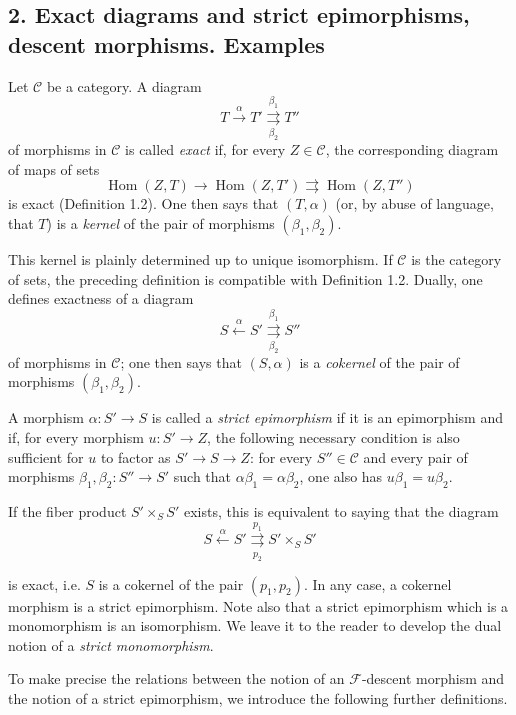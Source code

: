 \subsection*{2. Exact diagrams and strict epimorphisms, descent morphisms.
Examples}

 Let $\mathcal C$ be a category. A diagram
\[
  T\xrightarrow{\alpha}T'
  \overset{\beta_1}{\underset{\beta_2}{\rightrightarrows}}T''
\]
of morphisms in $\mathcal C$ is called \emph{exact} if, for every
$Z\in\mathcal C$, the corresponding diagram of maps of sets
\[
  \operatorname{Hom}(Z,T)\longrightarrow
  \operatorname{Hom}(Z,T')
  \rightrightarrows\operatorname{Hom}(Z,T'')
\]
is exact (Definition 1.2). One then says that $(T,\alpha)$ (or, by abuse of
language, that $T$) is a \emph{kernel} of the pair of morphisms
$(\beta_1,\beta_2)$.

This kernel is plainly determined up to unique isomorphism. If $\mathcal C$ is
the category of sets, the preceding definition is compatible with Definition
1.2. Dually, one defines exactness of a diagram
\[
  S\xleftarrow{\alpha}S'
  \overset{\beta_1}{\underset{\beta_2}{\rightrightarrows}}S''
\]
of morphisms in $\mathcal C$; one then says that $(S,\alpha)$ is a
\emph{cokernel} of the pair of morphisms $(\beta_1,\beta_2)$.

 A morphism $\alpha:S'\longrightarrow S$ is called a
\emph{strict epimorphism} if it is an epimorphism and if, for every morphism
$u:S'\longrightarrow Z$, the following necessary condition is also sufficient
for $u$ to factor as $S'\longrightarrow S\longrightarrow Z$: for every
$S''\in\mathcal C$ and every pair of morphisms
$\beta_1,\beta_2:S''\longrightarrow S'$ such that
$\alpha\beta_1=\alpha\beta_2$, one also has $u\beta_1=u\beta_2$.

If the fiber product $S'\times_S S'$ exists, this is equivalent to saying that
the diagram
\[
  S\xleftarrow{\alpha}S'
  \overset{p_1}{\underset{p_2}{\rightrightarrows}}S'\times_S S'
\]

is exact, i.e. $S$ is a cokernel of the pair $(p_1,p_2)$. In any case, a
cokernel morphism is a strict epimorphism. Note also that a strict epimorphism
which is a monomorphism is an isomorphism. We leave it to the reader to develop
the dual notion of a \emph{strict monomorphism}.

To make precise the relations between the notion of an $\mathcal F$-descent
morphism and the notion of a strict epimorphism, we introduce the following
further definitions.

